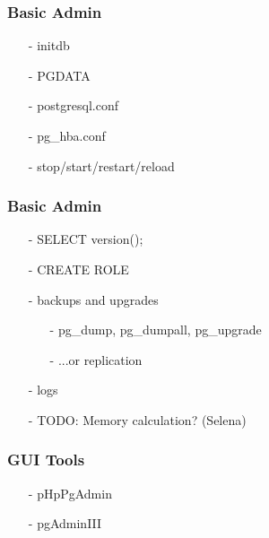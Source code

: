 \documentclass[20pt]{beamer}
\begin{document}
\frame
{
    \frametitle{Basic Admin}
    \begin{itemize}
    \item[-] initdb
    \item[-] PGDATA
    \item[-] postgresql.conf
    \item[-] pg\_hba.conf
    \item[-] stop/start/restart/reload
    \end{itemize}
}

\frame
{
    \frametitle{Basic Admin}
    \begin{itemize}
    \item[-] SELECT version();
    \item[-] CREATE ROLE
    \item[-] backups and upgrades
        \begin{itemize}
        \item[-] pg\_dump, pg\_dumpall, pg\_upgrade
        \item[-] ...or replication
        \end{itemize}
    \item[-] logs 
    \item[-] TODO:  Memory calculation?  (Selena)
    \end{itemize}
}

\frame
{
    \frametitle{GUI Tools}
    \begin{itemize}
    \item[-] pHpPgAdmin
    \item[-] pgAdminIII
    \end{itemize}
}


\end{document}
